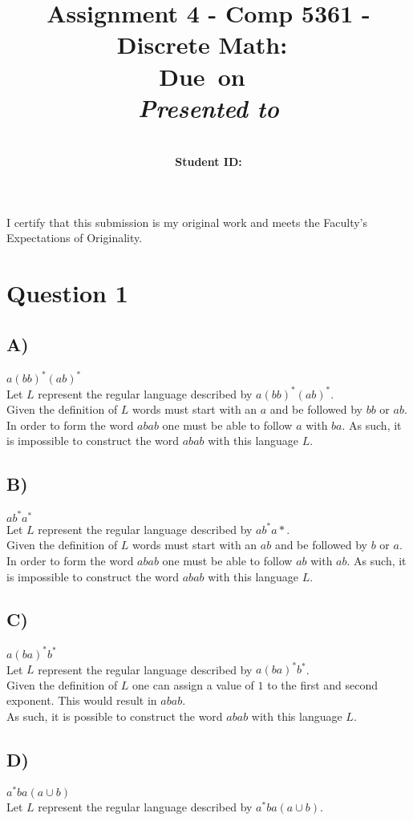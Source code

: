 \documentclass{report}
\title{Assignment 4 - Comp 5361 - Discrete Math}
\title{\vspace{2in}\textmd{\textbf{\hmwkClass:\ \hmwkTitle}}\\\normalsize\vspace{0.1in}\small{Due\ on\ \hmwkDueDate}\\\vspace{0.1in}\large{\textit{Presented to \hmwkClassInstructor}}\vspace{3in}}
\date{}
\author{\textbf{\hmwkAuthorName}\\
    \textbf{Student ID: \hmwkAuthorNumber}}
\begin{document}
\maketitle
I certify that this submission is my original work
and meets the Faculty's
Expectations of Originality.\\
\section*{Question 1}
\subsection*{A)}
$a(bb)^*(ab)^*$\\
Let $L$ represent the regular language described by $a(bb)^*(ab)^*$.\\

Given the definition of $L$ words must start with an $a$ and be followed by $bb$ or $ab$.\\

In order to form the word $abab$ one must be able to follow $a$ with $ba$. As such, it is impossible to construct the word $abab$ with this language $L$.
\subsection*{B)}
$ab^*a^*$\\
Let $L$ represent the regular language described by $ab^*a*$.\\

Given the definition of $L$ words must start with an $ab$ and be followed by $b$ or $a$.\\

In order to form the word $abab$ one must be able to follow $ab$ with $ab$. As such, it is impossible to construct the word $abab$ with this language $L$.
\subsection*{C)}
$a(ba)^*b^*$\\
Let $L$ represent the regular language described by $a(ba)^*b^*$.\\

Given the definition of $L$ one can assign a value of $1$ to the first and second exponent. This would result in $abab$.\\

As such, it is possible to construct the word $abab$ with this language $L$.
\subsection*{D)}
$a^*ba(a\cup b)$\\
Let $L$ represent the regular language described by $a^*ba(a\cup b)$.\\
\end{document}
